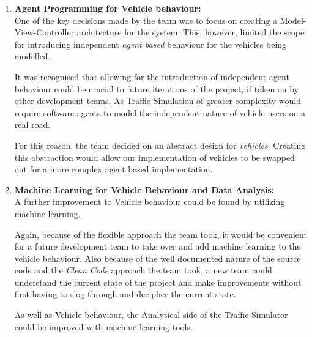 \documentclass[11pt]{article}
\begin{document}
{\begin{enumerate}
	However, because the team recognized the importance of overcoming the scalability problem they made it a goal to allow for future developers to introduce distributed deployment with as little complication as possible.
	
	The fundamental road network data structure kept the transitions between different roads and junctions as simple and lightweight as possible allowing those same transitions to be carried out over a network by introducing a transfer protocol to mimic the transition.\\
	
	\item \textbf{Agent Programming for Vehicle behaviour:}
	\\
	
	One of the key decisions made by the team was to focus on creating a Model-View-Controller architecture for the system. This, however, limited the scope for introducing independent \textit{agent based} behaviour for the vehicles being modelled.
	
	It was recognised that allowing for the introduction of independent agent behaviour could be crucial to future iterations of the project, if taken on by other development teams. As Traffic Simulation of greater complexity would require software agents to model the independent nature of vehicle users on a real road.
	
	For this reason, the team decided on an abstract design for \textit{vehicles}. Creating this abstraction would allow our implementation of vehicles to be swapped out for a more complex agent based implementation.\\
	
	\item \textbf{Machine Learning for Vehicle Behaviour and Data Analysis:}
	\\
	
	A further improvement to Vehicle behaviour could be found by utilizing machine learning.
	
	Again, because of the flexible approach the team took, it would be convenient for a future development team to take over and add machine learning to the vehicle behaviour. Also because of the well documented nature of the source code and the \textit{Clean Code} \cite{MartinRC08} approach the team took, a new team could understand the current state of the project and make improvements without first having to slog through and decipher the current state.
	
	As well as Vehicle behaviour, the Analytical side of the Traffic Simulator could be improved with machine learning tools.
	

\end{enumerate}}
\end{document}
